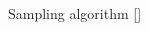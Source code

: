 \documentclass[10pt]{beamer}
\begin{document}
\begin{frame}{Sampling algorithm \hfill \small [\cite{Carrazza:2018nmd}]}
\begin{columns}
\begin{column}[]{0.4 \textwidth}
\begin{figure}[t!]
\begin{center}
                \end{center}
              \end{figure}
        \end{column}
    \end{columns}
\end{frame}
\end{document}
